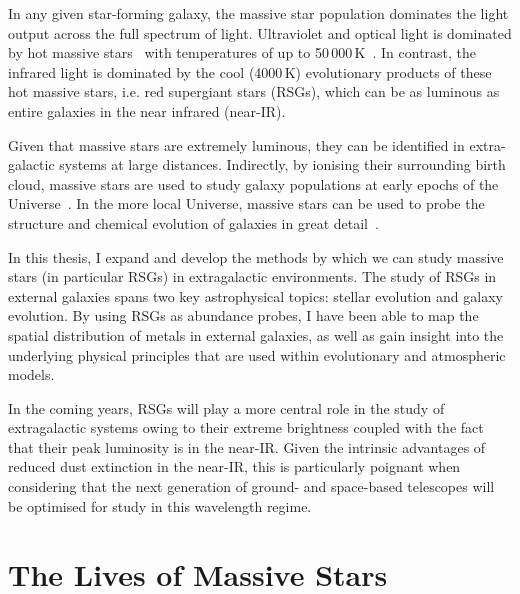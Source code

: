 In any given star-forming galaxy, the massive star population dominates the light output across the full spectrum of light.
Ultraviolet and optical light is dominated by hot massive stars~\citep{1998ARA&A..36..189K,2012ARA&A..50..531K} with temperatures of up to 50\,000\,K~\citep[e.g.][]{2011A&A...530L..14B}.
In contrast, the infrared light is dominated by the cool (4000\,K) evolutionary products of these hot massive stars, i.e. red supergiant stars (RSGs), which can be as luminous as entire galaxies in the near infrared (near-IR).

Given that massive stars are extremely luminous, they can be identified in extra-galactic systems at large distances.
Indirectly, by ionising their surrounding birth cloud, massive stars are used to study galaxy populations at early epochs of the Universe~\citep{2004MNRAS.348L..59P}.
In the more local Universe, massive stars can be used to probe the structure and chemical evolution of galaxies in great detail~\citep{2007ApJ...659.1198E,2008ApJ...681..269K,2008MNRAS.386..826E,2010AN....331..459K,2011A&A...530A.108E,2012A&A...542A..79C}.

In this thesis, I expand and develop the methods by which we can study massive stars (in particular RSGs) in extragalactic environments.
The study of RSGs in external galaxies spans two key astrophysical topics: stellar evolution and galaxy evolution.
By using RSGs as abundance probes, I have been able to map the spatial distribution of metals in external galaxies, as well as gain insight into the underlying physical principles that are used within evolutionary and atmospheric models.

In the coming years, RSGs will play a more central role in the study of extragalactic systems owing to their extreme brightness coupled with the fact that their peak luminosity is in the near-IR. Given the intrinsic advantages of reduced dust extinction in the near-IR, this is particularly poignant when considering that the next generation of ground- and space-based telescopes will be optimised for study in this wavelength regime.


\section{The Lives of Massive Stars} %
\label{sec:lives}

